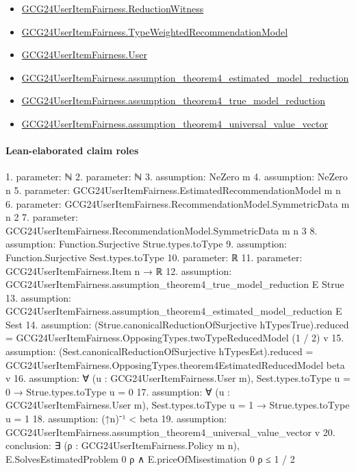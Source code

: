 \documentclass[10pt]{article}
\begin{document}
\begin{itemize}
\item \hyperlink{governing-declaration-09e04866bceb3cdb}{GCG24\allowbreak{}User\allowbreak{}Item\allowbreak{}Fairness.\allowbreak{}Reduction\allowbreak{}Witness}
\item \hyperlink{governing-declaration-9d0d71ba8ee67837}{GCG24\allowbreak{}User\allowbreak{}Item\allowbreak{}Fairness.\allowbreak{}Type\allowbreak{}Weighted\allowbreak{}Recommendation\allowbreak{}Model}
\item \hyperlink{governing-declaration-800dd691bc989470}{GCG24\allowbreak{}User\allowbreak{}Item\allowbreak{}Fairness.\allowbreak{}User}
\item \hyperlink{paper-prerequisite-0056dab12fde2982}{GCG24\allowbreak{}User\allowbreak{}Item\allowbreak{}Fairness.\allowbreak{}assumption\_\allowbreak{}theorem4\_\allowbreak{}estimated\_\allowbreak{}model\_\allowbreak{}reduction}
\item \hyperlink{paper-prerequisite-c46e8e73b66a828e}{GCG24\allowbreak{}User\allowbreak{}Item\allowbreak{}Fairness.\allowbreak{}assumption\_\allowbreak{}theorem4\_\allowbreak{}true\_\allowbreak{}model\_\allowbreak{}reduction}
\item \hyperlink{paper-prerequisite-7f385233e754d0d8}{GCG24\allowbreak{}User\allowbreak{}Item\allowbreak{}Fairness.\allowbreak{}assumption\_\allowbreak{}theorem4\_\allowbreak{}universal\_\allowbreak{}value\_\allowbreak{}vector}
\end{itemize}
\paragraph{Lean-elaborated claim roles}\begin{ReviewVerbatim}
1. parameter: ℕ
2. parameter: ℕ
3. assumption: NeZero m
4. assumption: NeZero n
5. parameter: GCG24UserItemFairness.EstimatedRecommendationModel m n
6. parameter: GCG24UserItemFairness.RecommendationModel.SymmetricData m n 2
7. parameter: GCG24UserItemFairness.RecommendationModel.SymmetricData m n 3
8. assumption: Function.Surjective Strue.types.toType
9. assumption: Function.Surjective Sest.types.toType
10. parameter: ℝ
11. parameter: GCG24UserItemFairness.Item n → ℝ
12. assumption: GCG24UserItemFairness.assumption_theorem4_true_model_reduction E Strue
13. assumption: GCG24UserItemFairness.assumption_theorem4_estimated_model_reduction E Sest
14. assumption: (Strue.canonicalReductionOfSurjective hTypesTrue).reduced =
  GCG24UserItemFairness.OpposingTypes.twoTypeReducedModel (1 / 2) v
15. assumption: (Sest.canonicalReductionOfSurjective hTypesEst).reduced =
  GCG24UserItemFairness.OpposingTypes.theorem4EstimatedReducedModel beta v
16. assumption: ∀ (u : GCG24UserItemFairness.User m), Sest.types.toType u = 0 → Strue.types.toType u = 0
17. assumption: ∀ (u : GCG24UserItemFairness.User m), Sest.types.toType u = 1 → Strue.types.toType u = 1
18. assumption: (↑n)⁻¹ < beta
19. assumption: GCG24UserItemFairness.assumption_theorem4_universal_value_vector v
20. conclusion: ∃ (ρ : GCG24UserItemFairness.Policy m n), E.SolvesEstimatedProblem 0 ρ ∧ E.priceOfMisestimation 0 ρ ≤ 1 / 2
\end{ReviewVerbatim}
\end{document}
